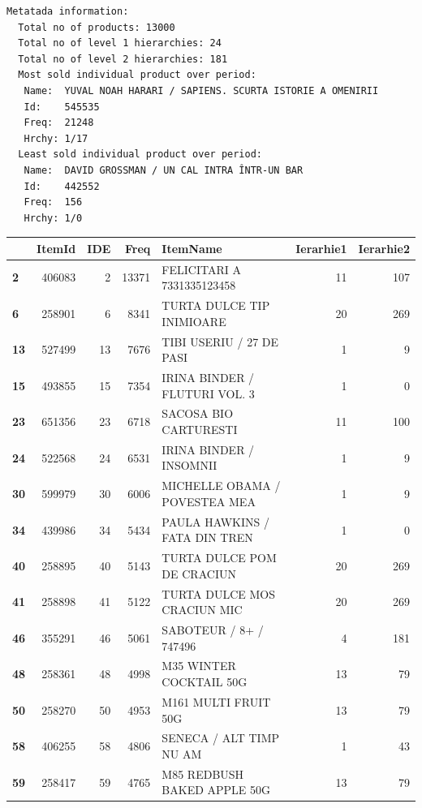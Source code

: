 \documentclass[11pt]{article}
\begin{document}
\begin{Verbatim}[commandchars=\\\{\},fontsize=\footnotesize]
Metatada information:
  Total no of products: 13000
  Total no of level 1 hierarchies: 24
  Total no of level 2 hierarchies: 181
  Most sold individual product over period:
   Name:  YUVAL NOAH HARARI / SAPIENS. SCURTA ISTORIE A OMENIRII
   Id:    545535
   Freq:  21248
   Hrchy: 1/17
  Least sold individual product over period:
   Name:  DAVID GROSSMAN / UN CAL INTRA ÎNTR-UN BAR
   Id:    442552
   Freq:  156
   Hrchy: 1/0

\end{Verbatim}



    \begin{center}
\scriptsize
\begin{tabular}{lrrrlrr}
\toprule
{} &  ItemId &  IDE &   Freq &                       ItemName &  Ierarhie1 &  Ierarhie2 \\
\midrule
\textbf{2 } &  406083 &    2 &  13371 &     FELICITARI A 7331335123458 &         11 &        107 \\
\textbf{6 } &  258901 &    6 &   8341 &      TURTA DULCE TIP INIMIOARE &         20 &        269 \\
\textbf{13} &  527499 &   13 &   7676 &       TIBI USERIU / 27 DE PASI &          1 &          9 \\
\textbf{15} &  493855 &   15 &   7354 &  IRINA BINDER / FLUTURI VOL. 3 &          1 &          0 \\
\textbf{23} &  651356 &   23 &   6718 &          SACOSA BIO CARTURESTI &         11 &        100 \\
\textbf{24} &  522568 &   24 &   6531 &        IRINA BINDER / INSOMNII &          1 &          9 \\
\textbf{30} &  599979 &   30 &   6006 &  MICHELLE OBAMA / POVESTEA MEA &          1 &          9 \\
\textbf{34} &  439986 &   34 &   5434 &  PAULA HAWKINS / FATA DIN TREN &          1 &          0 \\
\textbf{40} &  258895 &   40 &   5143 &     TURTA DULCE POM DE CRACIUN &         20 &        269 \\
\textbf{41} &  258898 &   41 &   5122 &    TURTA DULCE MOS CRACIUN MIC &         20 &        269 \\
\textbf{46} &  355291 &   46 &   5061 &         SABOTEUR / 8+ / 747496 &          4 &        181 \\
\textbf{48} &  258361 &   48 &   4998 &        M35 WINTER COCKTAIL 50G &         13 &         79 \\
\textbf{50} &  258270 &   50 &   4953 &           M161 MULTI FRUIT 50G &         13 &         79 \\
\textbf{58} &  406255 &   58 &   4806 &        SENECA / ALT TIMP NU AM &          1 &         43 \\
\textbf{59} &  258417 &   59 &   4765 &    M85 REDBUSH BAKED APPLE 50G &         13 &         79 \\
\bottomrule
\end{tabular}
\end{center}
\end{document}
